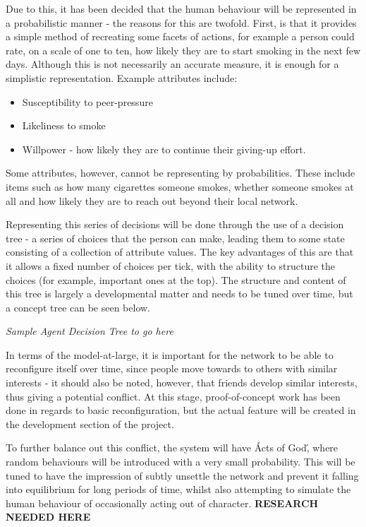 \documentclass[]{article}
\begin{document}
Due to this, it has been decided that the human behaviour will be represented in a probabilistic manner - the reasons for this are twofold. First, is that it provides a simple method of recreating some facets of actions, for example a person could rate, on a scale of one to ten, how likely they are to start smoking in the next few days. Although this is not necessarily an accurate measure, it is enough for a simplistic representation. Example attributes include:

\begin{itemize}
\item Susceptibility to peer-pressure
\item Likeliness to smoke
\item Willpower - how likely they are to continue their giving-up effort.
\end{itemize}

Some attributes, however, cannot be representing by probabilities. These include items such as how many cigarettes someone smokes, whether someone smokes at all and how likely they are to reach out beyond their local network.

Representing this series of decisions will be done through the use of a decision tree - a series of choices that the person can make, leading them to some state consisting of a collection of attribute values. The key advantages of this are that it allows a fixed number of choices per tick, with the ability to structure the choices (for example, important ones at the top). The structure and content of this tree is largely a developmental matter and needs to be tuned over time, but a concept tree can be seen below.

\emph{Sample Agent Decision Tree to go here}

In terms of the model-at-large, it is important for the network to be able to reconfigure itself over time, since people move towards to others with similar interests \cite{USN} - it should also be noted, however, that friends develop similar interests, thus giving a potential conflict. At this stage, proof-of-concept work has been done in regards to basic reconfiguration, but the actual feature will be created in the development section of the project. 

To further balance out this conflict, the system will have \'Acts of God\', where random behaviours will be introduced with a very small probability. This will be tuned to have the impression of subtly unsettle the network and prevent it falling into equilibrium for long periods of time, whilst also attempting to simulate the human behaviour of occasionally acting out of character. {\bf RESEARCH NEEDED HERE}
\end{document}
